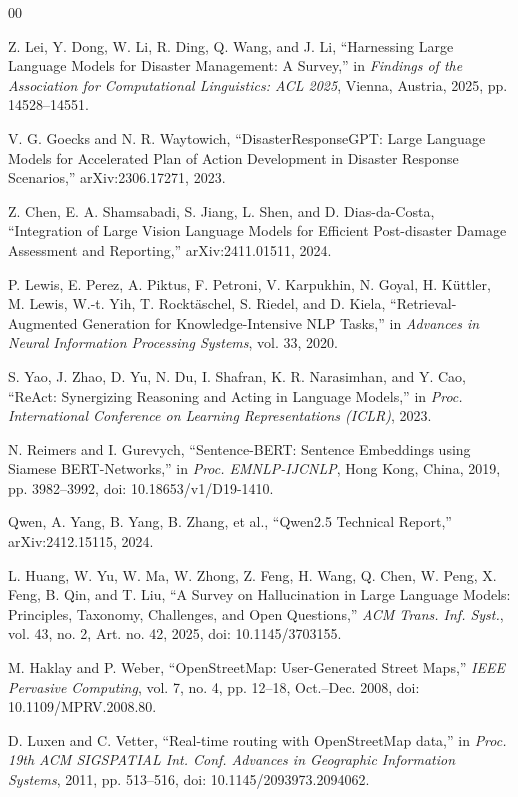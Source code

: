 \documentclass[conference]{IEEEtran}
\begin{document}
\begin{thebibliography}{00}

 Z. Lei, Y. Dong, W. Li, R. Ding, Q. Wang, and J. Li, ``Harnessing Large Language Models for Disaster Management: A Survey,'' in \textit{Findings of the Association for Computational Linguistics: ACL 2025}, Vienna, Austria, 2025, pp. 14528--14551.

 V. G. Goecks and N. R. Waytowich, ``DisasterResponseGPT: Large Language Models for Accelerated Plan of Action Development in Disaster Response Scenarios,'' arXiv:2306.17271, 2023.

 Z. Chen, E. A. Shamsabadi, S. Jiang, L. Shen, and D. Dias-da-Costa, ``Integration of Large Vision Language Models for Efficient Post-disaster Damage Assessment and Reporting,'' arXiv:2411.01511, 2024.

 P. Lewis, E. Perez, A. Piktus, F. Petroni, V. Karpukhin, N. Goyal, H. Küttler, M. Lewis, W.-t. Yih, T. Rocktäschel, S. Riedel, and D. Kiela, ``Retrieval-Augmented Generation for Knowledge-Intensive NLP Tasks,'' in \textit{Advances in Neural Information Processing Systems}, vol. 33, 2020.

 S. Yao, J. Zhao, D. Yu, N. Du, I. Shafran, K. R. Narasimhan, and Y. Cao, ``ReAct: Synergizing Reasoning and Acting in Language Models,'' in \textit{Proc. International Conference on Learning Representations (ICLR)}, 2023.

 N. Reimers and I. Gurevych, ``Sentence-BERT: Sentence Embeddings using Siamese BERT-Networks,'' in \textit{Proc. EMNLP-IJCNLP}, Hong Kong, China, 2019, pp. 3982--3992, doi: 10.18653/v1/D19-1410.

 Qwen, A. Yang, B. Yang, B. Zhang, et al., ``Qwen2.5 Technical Report,'' arXiv:2412.15115, 2024.

 L. Huang, W. Yu, W. Ma, W. Zhong, Z. Feng, H. Wang, Q. Chen, W. Peng, X. Feng, B. Qin, and T. Liu, ``A Survey on Hallucination in Large Language Models: Principles, Taxonomy, Challenges, and Open Questions,'' \textit{ACM Trans. Inf. Syst.}, vol. 43, no. 2, Art. no. 42, 2025, doi: 10.1145/3703155.

 M. Haklay and P. Weber, ``OpenStreetMap: User-Generated Street Maps,'' \textit{IEEE Pervasive Computing}, vol. 7, no. 4, pp. 12--18, Oct.--Dec. 2008, doi: 10.1109/MPRV.2008.80.

 D. Luxen and C. Vetter, ``Real-time routing with OpenStreetMap data,'' in \textit{Proc. 19th ACM SIGSPATIAL Int. Conf. Advances in Geographic Information Systems}, 2011, pp. 513--516, doi: 10.1145/2093973.2094062.


\end{thebibliography}
\end{document}
